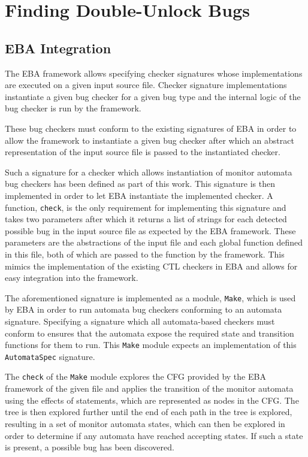 \section{Finding Double-Unlock Bugs}

\subsection{EBA Integration}
The EBA framework allows specifying checker signatures whose implementations are executed on a given input source file. Checker signature implementations instantiate a given bug checker for a given bug type and the internal logic of the bug checker is run by the framework. 

\newpar These bug checkers must conform to the existing signatures of EBA in order to allow the framework to instantiate a given bug checker after which an abstract representation of the input source file is passed to the instantiated checker. 

\newpar Such a signature for a checker which allows instantiation of monitor automata bug checkers has been defined as part of this work. This signature is then implemented in order to let EBA instantiate the implemented checker. A function, \texttt{check}, is the only requirement for implementing this signature and takes two parameters after which it returns a list of strings for each detected possible bug in the input source file as expected by the EBA framework. These parameters are the abstractions of the input file and each global function defined in this file, both of which are passed to the function by the framework. This mimics the implementation of the existing CTL checkers in EBA and allows for easy integration into the framework. 

\newpar The aforementioned signature is implemented as a module, \texttt{Make}, which is used by EBA in order to run automata bug checkers conforming to an automata signature. Specifying a signature which all automata-based checkers must conform to ensures that the automata expose the required state and transition functions for them to run. This \texttt{Make} module expects an implementation of this \texttt{AutomataSpec} signature. 

\newpar The \texttt{check} of the \texttt{Make} module explores the CFG provided by the EBA framework of the given file and applies the transition of the monitor automata using the effects of statements, which are represented as nodes in the CFG. The tree is then explored further until the end of each path in the tree is explored, resulting in a set of monitor automata states, which can then be explored in order to determine if any automata have reached accepting states. If such a state is present, a possible bug has been discovered. 

